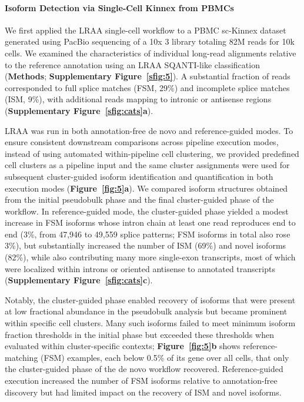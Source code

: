 \paragraph{Isoform Detection via Single-Cell Kinnex from PBMCs}\label{isoform-detection-via-single-cell-kinnex-from-pbmcs}

We first applied the LRAA single-cell workflow to a PBMC sc-Kinnex dataset generated using PacBio sequencing of a 10x 3\p{} library totaling 82M reads for 10k cells. We examined the characteristics of individual long-read alignments relative to the reference annotation using an LRAA SQANTI-like classification (\textbf{Methods}; \textbf{Supplementary Figure~\ref{sfig:5}}). A substantial fraction of reads corresponded to full splice matches (FSM, 29\%) and incomplete splice matches (ISM, 9\%), with additional reads mapping to intronic or antisense regions (\textbf{Supplementary Figure~\ref{sfig:cats}a}).

LRAA was run in both annotation-free de novo and reference-guided modes. To ensure consistent downstream comparisons across pipeline execution modes, instead of using automated within-pipeline cell clustering, we provided predefined cell clusters as a pipeline input and the same cluster assignments were used for subsequent cluster-guided isoform identification and quantification in both execution modes (\textbf{Figure~\ref{fig:5}a}). We compared isoform structures obtained from the initial pseudobulk phase and the final cluster-guided phase of the workflow. In reference-guided mode, the cluster-guided phase yielded a modest increase in FSM isoforms whose intron chain at least one read reproduces end to end (3\%, from 47,946 to 49,559 splice patterns; FSM isoforms in total also rose 3\%), but substantially increased the number of ISM (69\%) and novel isoforms (82\%), while also contributing many more single-exon transcripts, most of which were localized within introns or oriented antisense to annotated transcripts (\textbf{Supplementary Figure~\ref{sfig:cats}c}).

Notably, the cluster-guided phase enabled recovery of isoforms that were present at low fractional abundance in the pseudobulk analysis but became prominent within specific cell clusters. Many such isoforms failed to meet minimum isoform fraction thresholds in the initial phase but exceeded these thresholds when evaluated within cluster-specific contexts; \textbf{Figure~\ref{fig:5}b} shows reference-matching (FSM) examples, each below 0.5\% of its gene over all cells, that only the cluster-guided phase of the de novo workflow recovered. Reference-guided execution increased the number of FSM isoforms relative to annotation-free discovery but had limited impact on the recovery of ISM and novel isoforms.

